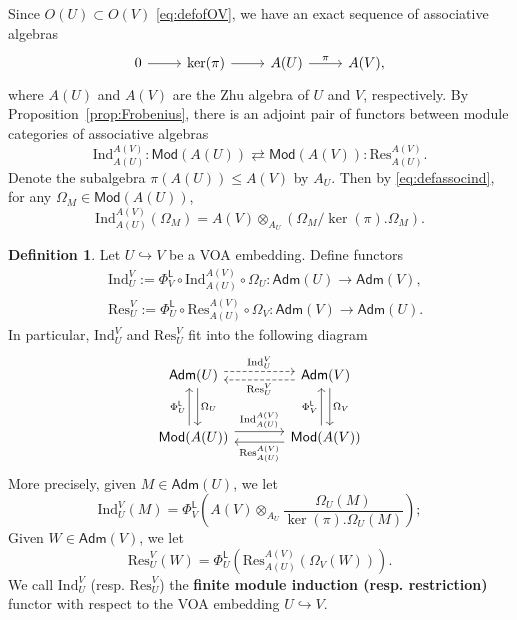 \documentclass[12pt,a4paper,reqno]{amsart}
\numberwithin{equation}{section}
\numberwithin{equation}{section}
\theoremstyle{definition}
\newtheorem{df}[thm]{Definition}
\def \ra {\rightarrow}
\def\hr{\hookrightarrow}
\def\Ind{\mathrm{Ind}}
\def\Res{\mathrm{Res}}
\def\L{\mathcal{L}}
\def\o{\otimes}
\def\Om{\Omega}
\def\Ind{\mathrm{Ind}}
\def\L{\mathsf{L}}
\def\L{\mathsf{L}}
\def\adm{\mathsf{Adm}}
\begin{document}
	Since $O(U)\subset O(V)$ \eqref{eq:defofOV}, we have an exact sequence of associative algebras
	\begin{equation}\label{eq:seqforA}
		\begin{tikzcd}
			0\arrow[r]& \ker(\pi)\arrow[r]& A(U)\arrow[r,"\pi"]& A(V),
		\end{tikzcd}
	\end{equation}
	where $A(U)$ and $A(V)$ are the Zhu algebra of $U$ and $V$, respectively.
	By Proposition~\ref{prop:Frobenius}, there is an adjoint pair of functors between module categories of associative algebras
	$$\Ind_{A(U)}^{A(V)}:\mathsf{Mod}(A(U))\rightleftarrows \mathsf{Mod}(A(V)):\mathrm{Res}^{A(V)}_{A(U)}.$$
	Denote the subalgebra $\pi(A(U))\leq A(V)$ by $A_U$. Then by \eqref{eq:defassocind}, for any $\Om_M\in \mathsf{Mod}(A(U))$,
	$$\Ind_{A(U)}^{A(V)}(\Om_M)=A(V)\o_{A_U}(\Om_M/\ker(\pi).\Om_M).$$
	
	\begin{df}\label{df:degreezeroind}
		Let $U\hr V$ be a VOA embedding. Define functors 
		\begin{align*}
			&	\Ind^V_U:=\Phi^\L_V\circ \Ind^{A(V)}_{A(U)}\circ \Om_U:\adm(U)\ra \adm(V),\\
			&	\Res^V_U:=\Phi^\L_U\circ \Res^{A(V)}_{A(U)}\circ \Om_V:\adm(V)\ra \adm(U).
		\end{align*}
		In particular, $	\Ind^V_U$ and $	\Res^V_U$ fit into the following diagram
		\begin{equation}\label{eq:inddiagram}
			\begin{tikzcd}[scale=1.5,row sep=large, column sep = large]
				\mathsf{Adm}(U)\arrow[r,dashed,shift left=2pt,"\mathrm{Ind}^V_U"]\arrow[d,shift left=2pt,"\Om_U"]& \mathsf{Adm}(V)\arrow[l,dashed,shift left=2pt,"\mathrm{Res}^V_U"]\arrow[d,shift left=2pt,"\Om_V"]\\
				\mathsf{Mod}(A(U))\arrow[r,shift left=3pt,"\mathrm{Ind}^{A(V)}_{A(U)}"]\arrow[u,shift left=2pt,"\Phi_U^\L"]& \mathsf{Mod}(A(V)) \arrow[l,shift left=2pt,"\mathrm{Res}^{A(V)}_{A(U)}"]\arrow[u,shift left=2pt,"\Phi_V^\L"]
			\end{tikzcd}
		\end{equation}
		More precisely, given $M\in \adm(U)$, we let 
		\begin{equation}\label{eq:ind}
			\Ind^V_U(M)=\Phi_V^\L\left(A(V)\o_{A_U}\frac{\Om_U(M)}{\ker(\pi).\Om_U(M)}\right);
		\end{equation}
		Given $W\in \adm(V)$, we let 
		\begin{equation}\label{eq:res}
			\Res^V_U(W)=\Phi_U^\L\left(\Res^{A(V)}_{A(U)}(\Om_V(W))\right).
		\end{equation}
		We call $\Ind^V_U$ (resp. $\Res^V_U$) the {\bf finite module induction (resp. restriction)} functor with respect to the VOA embedding $U\hr V$. 
	\end{df}
	
\end{document}
